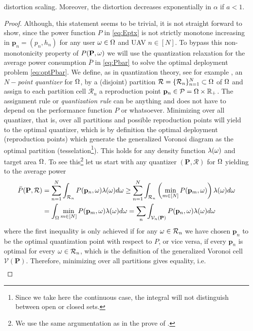 \documentclass[smallabstract,smallcaptions]{dccpaper}
\newcounter{example}[section]
\newif\ifproof\prooffalse %
\renewcommand{\vq}{\mathbf p}
\renewcommand{\vQ}{\mathbf P}
\newcommand{\Pbar}{\ensuremath{\bar{P}}}         %
\newcommand{\Vor}{\ensuremath{\mathcal{V}}}         %
\newcommand{\Rset}{\ensuremath{\mathcal R}}
\newcommand{\Qset}{\ensuremath{\mathcal P}}
\begin{document}
distortion scaling. Moreover, the distortion decreases exponentially in $\alpha$ if $a<1$.
%
\ifproof
\begin{proof}
  Although, this statement seems to be trivial, it is not straight forward to show, since the power function $P$ in
  \eqref{eq:Eptx} is not strictly monotone increasing in $\vq_n=(p_n,h_n)$ for any user $\omega \in\Omega$ and UAV
  $n\in[N]$. To bypass this non-monotonicity property of $P(\vQ,\ome)$ we will use the quantization relaxation for the
  average power consumption $\Pbar$ in \eqref{eq:Pbar} to  solve the optimal deployment problem \eqref{eq:optPbar}. We
  define, as in quantization theory, see for example \cite{GN98}, an \emph{$N-$point quantizer} for $\Omega$, by a
  (disjoint) partition $\Rset=\{\Rset_n\}_{n=1}^N\subset \Ome$ of $\Omega$ and assign to each partition cell $\Rset_n$ a
  reproduction point $\vq_n\in\Qset=\Ome\times\R_+$. The assignment rule or \emph{quantization rule} can be anything and
  does not have to depend on the performance function $P$ or whatsoever.  Minimizing over all quantizer, that is, over
  all partitions and possible reproduction points will yield to the optimal quantizer, which is by definition the
  optimal deployment (reproduction points) which generate the generalized Voronoi diagram as the optimal partition
  (tesselation\footnote{Since we take here the continuous case, the integral will not distinguish between open or closed
  sets.}). This holds for any density function $\lambda(\omega)$ and target area $\Omega$.  To see this\footnote{We use the
    same argumentation as in the prove of \cite[Prop.1]{Erdem}.} let us start with any quantizer $(\vQ,\Rset)$ for $\Omega$
    yielding to the average power 
  \begin{align}
    \Pbar(\vQ,\Rset) &=\sum_{n=1}^N \int_{\Rset_n} P(\vq_n,\ome)\lam(\ome) d\ome \geq \sum_{n=1}^N \int_{\Rset_n} 
    \left(\min_{m\in[N]} P(\vq_m,\ome) \right) \lam(\ome)d\ome\\
    &=\int_{\Ome} \min_{m\in[N]} P(\vq_m,\ome) \lam(\ome)d\ome
    =\sum_n \int_{\Vor_n(\vQ)} P(\vq_n,\ome) \lam(\ome)d\ome\notag
  \end{align} 
  where the first inequality is only achieved if for any $\ome\in \Rset_n$ we have chosen $\vq_n$ to be the optimal
  quantization point with respect to $P$, or vice versa, if every $\vq_n$ is optimal for every $\ome\in \Rset_n$, which is the
  definition of the generalized Voronoi cell $\Vor(\vQ)$. Therefore, minimizing over all partitions gives equality, i.e.
  \begin{align}

\end{align}
\end{proof}
\end{document}
